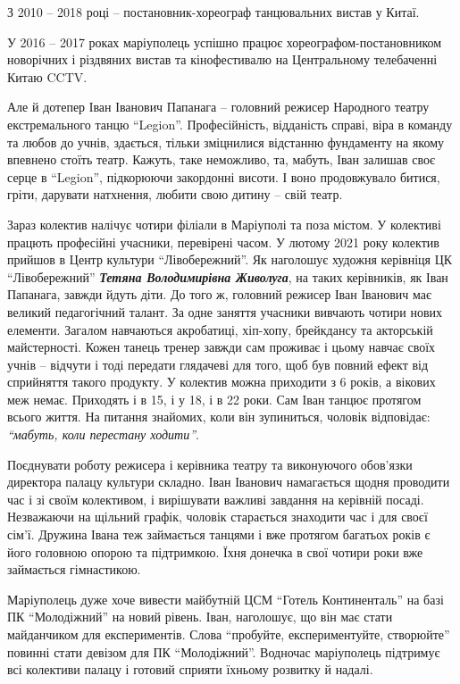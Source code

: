 З 2010 – 2018 році – постановник-хореограф танцювальних вистав у Китаї.

У 2016 – 2017 роках маріуполець успішно працює хореографом-постановником
новорічних і різдвяних вистав та кінофестивалю на Центральному телебаченні
Китаю CCTV.


Але й дотепер Іван Іванович Папанага – головний режисер Народного театру
екстремального танцю \enquote{Legion}. Професійність, відданість справі, віра в
команду та любов до учнів, здається, тільки зміцнилися відстанню фундаменту на
якому впевнено стоїть театр. Кажуть, таке неможливо, та, мабуть, Іван залишав
своє серце в \enquote{Legion}, підкорюючи закордонні висоти. І воно
продовжувало битися, гріти, дарувати натхнення, любити свою дитину – свій
театр.

Зараз колектив налічує чотири філіали в Маріуполі та поза містом. У колективі
працють професійні учасники, перевірені часом. У лютому 2021 року колектив
прийшов в Центр культури \enquote{Лівобережний}. Як наголошує художня керівніця
ЦК \enquote{Лівобережний} \emph{\textbf{Тетяна Володимирівна Живолуга}}, на
таких керівників, як Іван Папанага, завжди йдуть діти. До того ж, головний
режисер Іван Іванович має великий педагогічний талант. За одне заняття учасники
вивчають чотири нових елементи. Загалом навчаються акробатиці, хіп-хопу,
брейкдансу та акторській майстерності. Кожен танець тренер завжди сам проживає
і цьому навчає своїх учнів – відчути і тоді передати глядачеві для того, щоб
був повний ефект від сприйняття такого продукту. У колектив можна приходити з 6
років, а вікових меж немає. Приходять і в 15, і у 18, і в 22 роки. Сам Іван
танцює протягом всього життя. На питання знайомих, коли він зупиниться, чоловік
відповідає: \emph{\enquote{мабуть, коли перестану ходити}}.

Поєднувати роботу режисера і керівника театру та виконуючого обов'язки
директора палацу культури складно. Іван Іванович намагається щодня проводити
час і зі своїм колективом, і вирішувати важливі завдання на керівній посаді.
Незважаючи на щільний графік, чоловік старається знаходити час і для своєї
сім'ї. Дружина Івана теж займається танцями і вже протягом багатьох років є
його головною опорою та підтримкою. Їхня донечка в свої чотири роки вже
займається гімнастикою.

Маріуполець  дуже хоче вивести майбутній ЦСМ \enquote{Готель Континенталь} на базі ПК
\enquote{Молодіжний} на новий рівень. Іван, наголошує, що він має стати майданчиком для
експериментів. Слова \enquote{пробуйте, експериментуйте, створюйте} повинні стати
девізом для ПК \enquote{Молодіжний}. Водночас маріуполець підтримує всі колективи
палацу і готовий сприяти їхньому розвитку й надалі.


